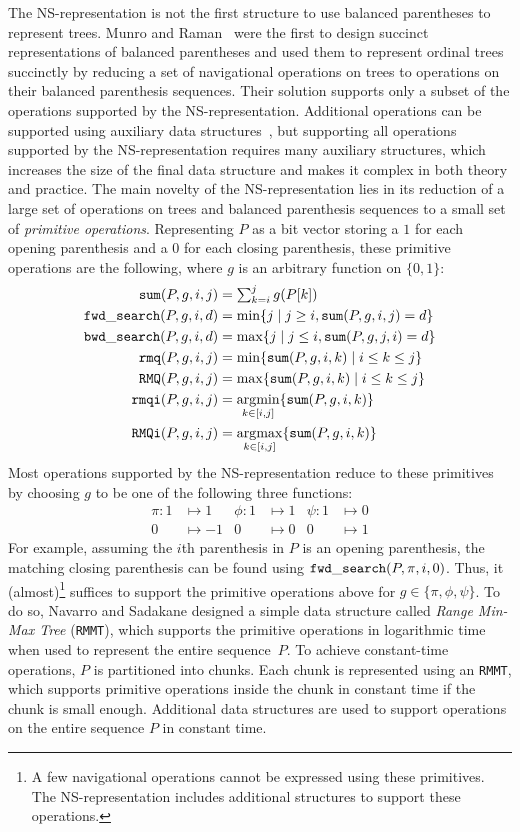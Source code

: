 The NS-representa\-tion is not the first structure to use balanced
parentheses to represent trees.  Munro and Raman~\cite{mr1997} were
the first to design succinct representations of balanced parentheses
and used them to represent ordinal trees succinctly by reducing a set
of navigational operations on trees to operations on their balanced
parenthesis sequences.  Their solution supports only a subset of the
operations supported by the NS-representation.  Additional operations
can be supported using auxiliary data structures~\cite{ly2008}, but
supporting all operations supported by the NS-representation requires many
auxiliary structures, which increases the size of the final data structure
and makes it complex in both theory and practice.  The main novelty of
the NS-representation lies in its reduction of a large set of
operations on trees and balanced parenthesis sequences to a small set
of \emph{primitive operations}.  Representing $P$ as a bit vector
storing a $1$ for each opening parenthesis and a $0$ for each closing
parenthesis, these primitive operations are the following, where $g$ is an
arbitrary function on $\{0,1\}$:
\begin{align*}
  \mathtt{sum}(P,g,i,j) &= \textstyle\sum_{k=i}^jg(P[k])\\
  \mathtt{fwd\_search}(P,g,i,d) &= \min\{j \mid j \ge i, \mathtt{sum}(P,g,i,j) = d\}\\
  \mathtt{bwd\_search}(P,g,i,d) &= \max\{j \mid j \le i, \mathtt{sum}(P,g,j,i) = d\}\\
  \mathtt{rmq}(P,g,i,j) &= \min\{\mathtt{sum}(P,g,i,k) \mid i\le k\le j\}\\
  \mathtt{RMQ}(P,g,i,j) &= \max\{\mathtt{sum}(P,g,i,k) \mid i\le k\le j\}\\
  \mathtt{rmqi}(P,g,i,j) &= \operatorname*{arg\!\min}_{k\in[i,j]}\{\mathtt{sum}(P,g,i,k)\}\\
  \mathtt{RMQi}(P,g,i,j) &= \operatorname*{arg\!\max}_{k\in[i,j]}\{\mathtt{sum}(P,g,i,k)\}
\end{align*}
Most operations supported by the NS-representation reduce to these primitives
by choosing $g$ to be one of the following three functions:
\begin{align*}
  \pi : 1 &\mapsto 1 &\phi : 1 &\mapsto 1 & \psi : 1 &\mapsto 0\\
  0 &\mapsto -1 & 0 &\mapsto 0 & 0 &\mapsto 1
\end{align*}
For example, assuming the $i$th parenthesis in $P$ is an opening parenthesis,
the matching closing parenthesis can be found using
$\mathtt{fwd\_search}(P,\pi,i,0)$.  Thus, it (almost)\footnote{A few
  navigational operations cannot be expressed using these primitives.
  The NS-representation includes additional structures to support
  these operations.} suffices to support the primitive operations above for
$g \in \{\pi, \phi, \psi\}$.  To do so, Navarro and Sadakane designed
a simple data structure called \emph{Range Min-Max Tree} ({\tt RMMT}),
which supports the primitive operations in logarithmic time when used
to represent the entire sequence~$P$.  To achieve constant-time
operations, $P$ is partitioned into chunks.  Each chunk is represented
using an {\tt RMMT}, which supports primitive operations inside the
chunk in constant time if the chunk is small enough.  Additional data
structures are used to support operations on the entire sequence $P$
in constant time.

